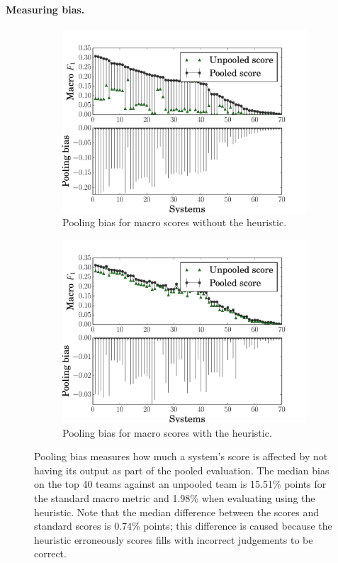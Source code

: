 \paragraph{Measuring bias.}
\begin{figure}[t]
  \begin{subfigure}{\columnwidth}
  \includegraphics[width=\columnwidth]{figures/pooling_bias/pooling_bias_closed-world}
  \caption{Pooling bias for macro \fone{} scores without the \anydoc{} heuristic.}
  \end{subfigure}
  \begin{subfigure}{\columnwidth}
  \includegraphics[width=\columnwidth]{figures/pooling_bias/pooling_bias_anydoc}
  \caption{Pooling bias for macro \fone{} scores with the \anydoc{} heuristic.}
  \end{subfigure}
  \caption{\label{fig:pooling-bias} Pooling bias measures how much a system's score is affected by not having its output as part of the pooled evaluation.
  The median bias on the top 40 teams against an unpooled team is 15.51\% points for the standard macro \fone{} metric and 1.98\% when evaluating using the \anydoc{} heuristic.
  Note that the median difference between the \anydoc{} scores and standard scores is 0.74\% points; this difference is caused because the \anydoc{} heuristic erroneously scores fills with incorrect judgements to be correct.}
\end{figure}

